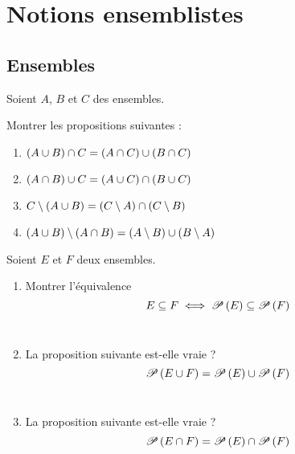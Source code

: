 \chapter{Notions ensemblistes}

\minitoc

\section{Ensembles}

\begin{exo}
Soient \(A\), \(B\) et \(C\) des ensembles.

Montrer les propositions suivantes :

\begin{enumerate}
\item \(\left(A\cup B\right)\cap C=\left(A\cap C\right)\cup\left(B\cap C\right)\) \\

\item \(\left(A\cap B\right)\cup C=\left(A\cup C\right)\cap\left(B\cup C\right)\) \\

\item \(C\setminus\left(A\cup B\right)=\left(C\setminus A\right)\cap\left(C\setminus B\right)\) \\

\item \(\left(A\cup B\right)\setminus\left(A\cap B\right)=\left(A\setminus B\right)\cup\left(B\setminus A\right)\)
\end{enumerate}
\end{exo}

\begin{corr}
\end{corr}

\begin{exo}
Soient \(E\) et \(F\) deux ensembles.

\begin{enumerate}
\item Montrer l'équivalence \[E\subseteq F\iff\mathscr{P}\left(E\right)\subseteq\mathscr{P}\left(F\right)\] \\

\item La proposition suivante est-elle vraie ? \[\mathscr{P}\left(E\cup F\right)=\mathscr{P}\left(E\right)\cup\mathscr{P}\left(F\right)\] \\

\item La proposition suivante est-elle vraie ? \[\mathscr{P}\left(E\cap F\right)=\mathscr{P}\left(E\right)\cap\mathscr{P}\left(F\right)\]
\end{enumerate}
\end{exo}

